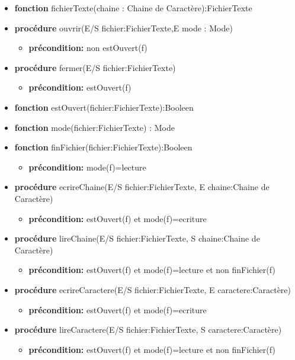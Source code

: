 	\begin{itemize}[label=$\ $, leftmargin=1cm]
		 \item \textbf{fonction} fichierTexte(chaine : Chaine de Caractère):FichierTexte
		 \item \textbf{procédure} ouvrir(E/S fichier:FichierTexte,E mode : Mode)
		 \begin{itemize}[label=$| $]
            \item \textbf{précondition:} non estOuvert(f)
         \end{itemize}
         \item \textbf{procédure} fermer(E/S fichier:FichierTexte)
		 \begin{itemize}[label=$| $]
            \item \textbf{précondition:} estOuvert(f)
         \end{itemize}
		 \item \textbf{fonction} estOuvert(fichier:FichierTexte):Booleen
		 \item \textbf{fonction} mode(fichier:FichierTexte) : Mode
		 \item \textbf{fonction} finFichier(fichier:FichierTexte):Booleen
		 \begin{itemize}[label=$| $]
            \item \textbf{précondition:} mode(f)=lecture
         \end{itemize}
         \item \textbf{procédure} ecrireChaine(E/S fichier:FichierTexte, E chaine:Chaine de Caractère)
         \begin{itemize}[label=$| $]
            \item \textbf{précondition:} estOuvert(f) et mode(f)=ecriture
         \end{itemize}
         \item \textbf{procédure} lireChaine(E/S fichier:FichierTexte, S chaine:Chaine de Caractère)
         \begin{itemize}[label=$| $]
            \item \textbf{précondition:} estOuvert(f) et mode(f)=lecture et non finFichier(f)
         \end{itemize}
         \item \textbf{procédure} ecrireCaractere(E/S fichier:FichierTexte, E caractere:Caractère)
         \begin{itemize}[label=$| $]
            \item \textbf{précondition:} estOuvert(f) et mode(f)=ecriture
         \end{itemize}
         \item \textbf{procédure} lireCaractere(E/S fichier:FichierTexte, S caractere:Caractère)
         \begin{itemize}[label=$| $]
            \item \textbf{précondition:} estOuvert(f) et mode(f)=lecture et non finFichier(f)
         \end{itemize}

	\end{itemize} 


